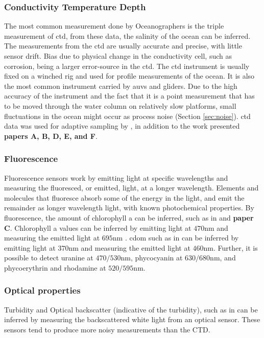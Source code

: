 \subsubsection*{Conductivity Temperature Depth}
 The most common measurement done by Oceanographers is the triple measurement of \acrfull{ctd}, from these data, the salinity of the ocean can be inferred. The measurements from the \acrshort{ctd} are usually accurate and precise, with little sensor drift. Bias due to physical change in the conductivity cell, such as corrosion, being a larger error-source in the \acrshort{ctd}. The \acrshort{ctd} instrument is usually fixed on a winched rig and used for profile measurements of the ocean. It is also the most common instrument carried by \acrshort{auv}s and gliders. Due to the high accuracy of the instrument and the fact that it is a point measurement that has to be moved through the water column on relatively slow platforms, small fluctuations in the ocean might occur as process noise (Section \ref{sec:noise}). \acrshort{ctd} data was used for adaptive sampling by \textcite{fossum2021adaptive,fossum2021learning,zhang2012autonomous}, in addition to the work presented \textbf{papers A, B, D, E, and F}. 

\subsubsection*{Fluorescence}
Fluorescence sensors work by emitting light at specific wavelengths and measuring the fluoresced, or emitted, light, at a longer wavelength. Elements and molecules that fluoresce absorb some of the energy in the light, and emit the remainder as longer wavelength light, with known photochemical properties. By fluorescence, the amount of chlorophyll a can be inferred, such as in \textcite{kemna2018multi,fossum2019toward} and \textbf{paper C}. Chlorophyll a values can be inferred by emitting light at $470$nm and measuring the emitted light at $695$nm \cite{boss2016primer}. \acrfull{cdom} such as in \textcite{zhang2011peak} can be inferred by emitting light at $370$nm and measuring the emitted light at $460$nm. Further, it is possible to detect uranine at $470/530$nm, phycocyanin at $630/680$nm, and phycoerythrin and rhodamine at $520/595$nm. 

\subsubsection*{Optical properties}
Turbidity and Optical backscatter (indicative of the turbidity), such as in \textcite{berget2018adaptive} can be inferred by measuring the backscattered white light from an optical sensor. These sensors tend to produce more noisy measurements than the CTD. 


